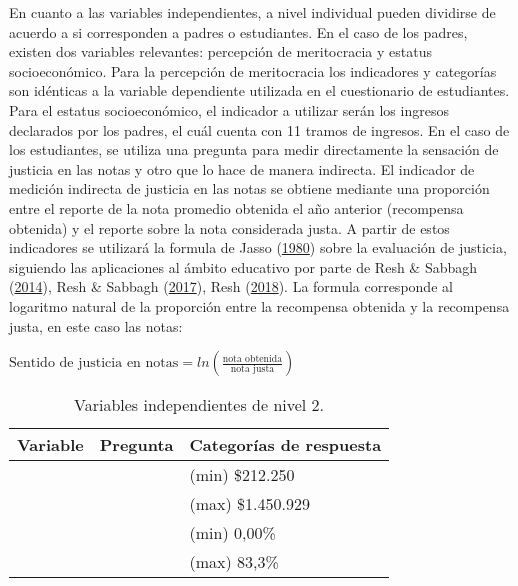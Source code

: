 \documentclass[
  12pt,
]{article}
\begin{document}
En cuanto a las variables independientes, a nivel individual pueden
dividirse de acuerdo a si corresponden a padres o estudiantes. En el
caso de los padres, existen dos variables relevantes: percepción de
meritocracia y estatus socioeconómico. Para la percepción de
meritocracia los indicadores y categorías son idénticas a la variable
dependiente utilizada en el cuestionario de estudiantes. Para el estatus
socioeconómico, el indicador a utilizar serán los ingresos declarados
por los padres, el cuál cuenta con 11 tramos de ingresos. En el caso de
los estudiantes, se utiliza una pregunta para medir directamente la
sensación de justicia en las notas y otro que lo hace de manera
indirecta. El indicador de medición indirecta de justicia en las notas
se obtiene mediante una proporción entre el reporte de la nota promedio
obtenida el año anterior (recompensa obtenida) y el reporte sobre la
nota considerada justa. A partir de estos indicadores se utilizará la
formula de Jasso (\protect\hyperlink{ref-jasso_New_1980}{1980}) sobre la
evaluación de justicia, siguiendo las aplicaciones al ámbito educativo
por parte de Resh \& Sabbagh
(\protect\hyperlink{ref-resh_Sense_2014}{2014}), Resh \& Sabbagh
(\protect\hyperlink{ref-resh_Sense_2017}{2017}), Resh
(\protect\hyperlink{ref-resh_Sense_2018}{2018}). La formula corresponde
al logaritmo natural de la proporción entre la recompensa obtenida y la
recompensa justa, en este caso las notas:

\(\text{Sentido de justicia en notas}= ln(\frac{\text{nota obtenida}}{\text{nota justa}})\)

\pagebreak

\begin{table}[!h]

\caption{\label{tab:table-independientesn2}Variables independientes de nivel 2.}
\centering
\fontsize{10}{12}\selectfont
\begin{tabu} to 
\toprule
Variable & Pregunta & Categorías de respuesta\\
\midrule
 &  & (min) \$212.250\\
 &  & (max) \$1.450.929\\
 &  & (min) 0,00\%\\
 &  & (max) 83,3\%\\
\bottomrule
\end{tabu}
\end{table}
\end{document}
